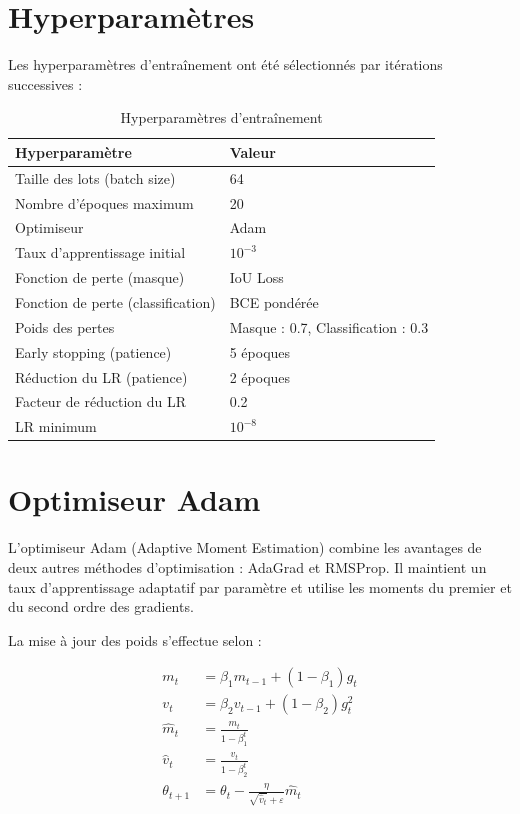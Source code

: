 \documentclass[12pt,a4paper,twoside]{report}
\begin{document}
\section{Hyperparamètres}

Les hyperparamètres d'entraînement ont été sélectionnés par itérations successives :

\begin{table}[H]
\centering
\begin{tabular}{ll}
\toprule
\textbf{Hyperparamètre} & \textbf{Valeur} \\
\midrule
Taille des lots (batch size) & 64 \\
Nombre d'époques maximum & 20 \\
Optimiseur & Adam \\
Taux d'apprentissage initial & $10^{-3}$ \\
Fonction de perte (masque) & IoU Loss \\
Fonction de perte (classification) & BCE pondérée \\
Poids des pertes & Masque : 0.7, Classification : 0.3 \\
Early stopping (patience) & 5 époques \\
Réduction du LR (patience) & 2 époques \\
Facteur de réduction du LR & 0.2 \\
LR minimum & $10^{-8}$ \\
\bottomrule
\end{tabular}
\caption{Hyperparamètres d'entraînement}
\end{table}

\section{Optimiseur Adam}

L'optimiseur Adam (Adaptive Moment Estimation) combine les avantages de deux autres méthodes d'optimisation : AdaGrad et RMSProp. Il maintient un taux d'apprentissage adaptatif par paramètre et utilise les moments du premier et du second ordre des gradients.

La mise à jour des poids s'effectue selon :

\begin{align}
m_t &= \beta_1 m_{t-1} + (1-\beta_1) g_t \\
v_t &= \beta_2 v_{t-1} + (1-\beta_2) g_t^2 \\
\hat{m}_t &= \frac{m_t}{1-\beta_1^t} \\
\hat{v}_t &= \frac{v_t}{1-\beta_2^t} \\
\theta_{t+1} &= \theta_t - \frac{\eta}{\sqrt{\hat{v}_t} + \varepsilon} \hat{m}_t
\end{align}
\end{document}
